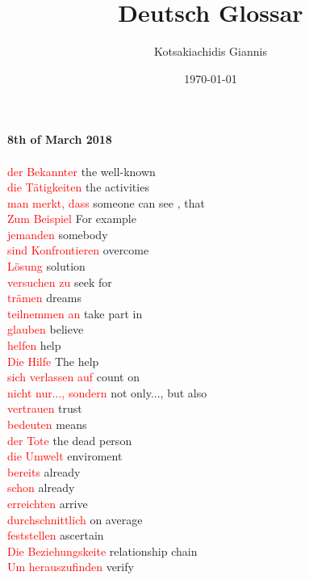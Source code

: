 \documentclass{article}
\title{\textbf{Deutsch Glossar}}
\author{Kotsakiachidis Giannis }
\date{\today }
\begin{document}
	\maketitle
	
	\clearpage
	
	\begin{multicols}{2}
	
	\textbf{8th of March 2018}\\\\
	\textcolor{red}{der Bekannter} the well-known\\
	\textcolor{red}{die Tätigkeiten} the activities\\
	\textcolor{red}{man merkt, dass} someone can see , that\\
	\textcolor{red}{Zum Beispiel} For example\\
	\textcolor{red}{jemanden} somebody\\
	\textcolor{red}{sind Konfrontieren} overcome\\
	\textcolor{red}{Lösung} solution\\
	\textcolor{red}{versuchen zu} seek for\\
	\textcolor{red}{trämen} dreams\\
	\textcolor{red}{teilnemmen an} take part in\\
	\textcolor{red}{glauben} believe\\
	\textcolor{red}{helfen} help\\
	\textcolor{red}{Die Hilfe} The help\\
	\textcolor{red}{sich verlassen auf} count on\\
	\textcolor{red}{nicht nur..., sondern} not only..., but also\\
	\textcolor{red}{vertrauen} trust\\
	\textcolor{red}{bedeuten} means\\
	\textcolor{red}{der Tote} the dead person\\
	\textcolor{red}{die Umwelt} enviroment\\
	\textcolor{red}{bereits} already\\
	\textcolor{red}{schon} already\\
	\textcolor{red}{erreichten} arrive\\
	\textcolor{red}{durchschnittlich} on average\\
	\textcolor{red}{feststellen} ascertain\\
	\textcolor{red}{Die Beziehungskeite} relationship chain\\
	\textcolor{red}{Um herauszufinden} verify\\

\end{multicols}
\end{document}
